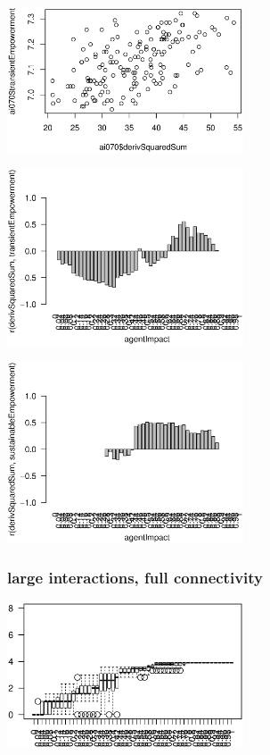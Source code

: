 \documentclass[conference]{IEEEtran}
\begin{document}
\centerline{\includegraphics[width=7cm]{n08_full_small_corr_dss_emp_ai070.eps}}

\centerline{\includegraphics[width=7cm]{n08_full_small_corr_dss_emp.eps}}

\centerline{\includegraphics[width=7cm]{n08_full_small_corr_dss_empsust.eps}}


\pagebreak


\subsubsection{large interactions, full connectivity}

\rule{0pt}{0pt}

\centerline{\includegraphics[width=7cm]{n08_full_large_emp.eps}}
\end{document}
